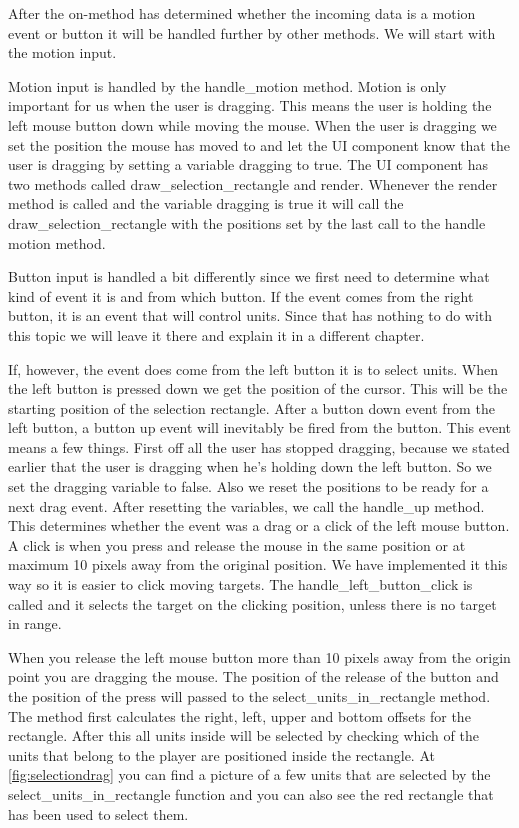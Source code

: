 After the on-method has determined whether the incoming data is a motion event
or button it will be handled further by other methods. We will start with the
motion input.

Motion input is handled by the handle\_motion method. Motion is only
important for us when the user is dragging. This means the user is holding the
left mouse button down while moving the mouse. When the user is dragging we set
the position the mouse has moved to and let the UI component know that the user
is dragging by setting a variable dragging to true. The UI component has two
methods called draw\_selection\_rectangle and render. Whenever the render
method is called and the variable dragging is true it will call the
draw\_selection\_rectangle with the positions set by the last call to the 
handle motion method.

Button input is handled a bit differently since we first need to determine what
kind of event it is and from which button. If the event comes from the right
button, it is an event that will control units. Since that has nothing to do
with this topic we will leave it there and explain it in a different chapter. 

If, however, the event does come from the left button it is to select units. 
When the left button is pressed down we get the position of the cursor. 
This will be the starting position of the selection rectangle. After a button 
down event from the left button, a button up event will inevitably be fired 
from the button. This event means a few things. First off all the user has 
stopped dragging, because we stated earlier that the user is dragging when he's 
holding down the left button. So we set the dragging variable to false. Also we 
reset the positions to be ready for a next drag event. After resetting the 
variables, we call the handle\_up method. This determines whether the event 
was a drag or a click of the left mouse button. A click is when you press and 
release the mouse in the same position or at maximum 10 pixels away from the 
original position. We have implemented it this way so it is easier to click 
moving targets. The handle\_left\_button\_click is called and it selects the 
target on the clicking position, unless there is no target in range.

When you release the left mouse button more than 10 pixels away from the origin
point you are dragging the mouse. The position of the release of the button and
the position of the press will passed to the select\_units\_in\_rectangle
method. The method first calculates the right, left, upper and bottom offsets 
for the rectangle. After this all units inside will be selected by checking 
which of the units that belong to the player are positioned inside the 
rectangle. At \cref{fig:selectiondrag} you can find a picture of a few 
units that are selected by the select\_units\_in\_rectangle function and you 
can also see the red rectangle that has been used to select them. 

